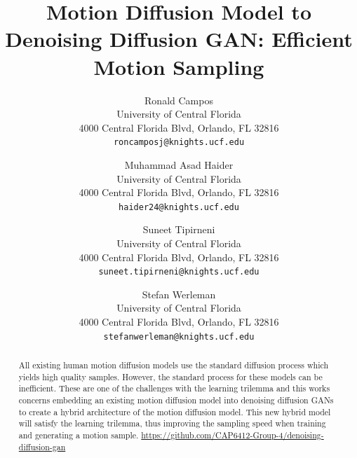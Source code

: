 \documentclass[10pt,twocolumn,letterpaper]{article}
\begin{document}
\title{Motion Diffusion Model to Denoising Diffusion GAN: Efficient Motion Sampling}

\author{
    Ronald Campos\\
    University of Central Florida\\
    4000 Central Florida Blvd, Orlando, FL 32816\\
    {\tt\small roncamposj@knights.ucf.edu}
    \and
    Muhammad Asad Haider\\
    University of Central Florida\\
    4000 Central Florida Blvd, Orlando, FL 32816\\
    {\tt\small haider24@knights.ucf.edu}
    \and
    Suneet Tipirneni\\
    University of Central Florida\\
    4000 Central Florida Blvd, Orlando, FL 32816\\
    {\tt\small suneet.tipirneni@knights.ucf.edu}
    \and
    Stefan Werleman\\
    University of Central Florida\\
    4000 Central Florida Blvd, Orlando, FL 32816\\
    {\tt\small stefanwerleman@knights.ucf.edu}
}


\maketitle

\begin{abstract}
    All existing human motion diffusion models use the standard diffusion process which yields high 
    quality samples. However, the standard process for these models can be inefficient. These are one of
    the challenges with the learning trilemma and this works concerns embedding an existing motion diffusion 
    model into denoising diffusion GANs to create a hybrid architecture of the motion diffusion model. This 
    new hybrid model will satisfy the learning trilemma, thus improving the sampling speed when training and generating a motion sample.
    \url{https://github.com/CAP6412-Group-4/denoising-diffusion-gan}
\end{abstract}
\end{document}
